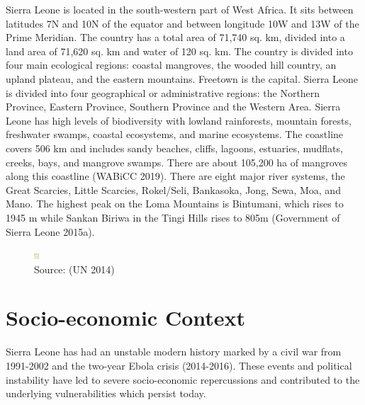 \documentclass[
]{book}
\begin{document}
Sierra Leone is located in the south-western part of West Africa. It sits between latitudes 7N and 10N of the equator and between longitude 10W and 13W of the Prime Meridian. The country has a total area of 71,740 sq. km, divided into a land area of 71,620 sq. km and water of 120 sq. km. The country is divided into four main ecological regions: coastal mangroves, the wooded hill country, an upland plateau, and the eastern mountains.
Freetown is the capital. Sierra Leone is divided into four geographical or administrative regions: the Northern Province, Eastern Province, Southern Province and the Western Area. Sierra Leone has high levels of biodiversity with lowland rainforests, mountain forests, freshwater swamps, coastal ecosystems, and marine ecosystems. The coastline covers 506 km and includes sandy beaches, cliffs, lagoons, estuaries, mudflats, creeks, bays, and mangrove swamps. There are about 105,200 ha of mangroves along this coastline (WABiCC 2019). There are eight major river systems, the Great Scarcies, Little Scarcies, Rokel/Seli, Bankasoka, Jong, Sewa, Moa, and Mano. The highest peak on the Loma Mountains is Bintumani, which rises to 1945 m while Sankan Biriwa in the Tingi Hills rises to 805m (Government of Sierra Leone 2015a).

\begin{figure}
\centering
\includegraphics[width=0.07292in,height=\textheight]{images/sl_geography.png}
\caption{Source: (UN 2014)}
\end{figure}

\hypertarget{socio-economic-context}{%
\section{Socio-economic Context}\label{socio-economic-context}}

Sierra Leone has had an unstable modern history marked by a civil war from 1991-2002 and the two-year Ebola crisis (2014-2016). These events and political instability have led to severe socio-economic repercussions and contributed to the underlying vulnerabilities which persist today.
\end{document}

